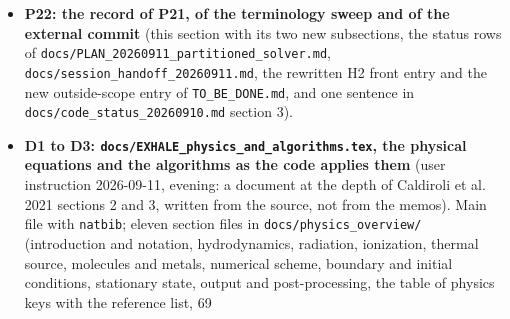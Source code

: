 \documentclass[english,a4paper]{my_memo}
\begin{document}
\begin{itemize}
  Tests: \texttt{carrier\_retry} \textbf{122/0 at entry, 124 PASS / 3 FAIL on a RED build}
  carrying the delivered module with the one
  \texttt{call\ equilibrate\_chemistry\_at\_fixed\_pressure} line removed, \textbf{127/0 after}.
  The new section (11) has five rows and states why the joint fixed point cannot
  be asserted on the synthetic 12-cell column at all: the shortest admissible
  trial still moves 6.46e-4 of the largest entry H2 mixing ratio, six decades
  above \texttt{relax\_tol\ =\ 1e-10}. What it asserts instead is the consistency the joint
  fixed point rests on: the background third-body density read from the returned
  composition (GREEN 4.7244E-07 against the entry composition\textquotesingle s 5.5008E-03; RED
  5.4938E-03 against 1.2191E-16), the background temperature (GREEN 2.5675E-07
  against 5.4837E-03; RED 5.5241E-03 against 0), and one further sweep moving the
  composition by 1.3637E-10 against hybrd1\textquotesingle s own \texttt{xtol\ =\ sqrt(eps)\ =\ 1.5E-08}
  (RED 2.0110E-04). Every other suite whose driver links
  \texttt{diffusive\_photochemistry} is unchanged before and after:
  \texttt{carrier\_returned\_state\_acceptance} 36/0, \texttt{attempted\_step} 70/0,
  \texttt{steady\_species\_rows} 195/0, \texttt{certification} 70/0,
  \texttt{carrier\_constraint\_attribution} 10/0, \texttt{carrier\_reference\_scales} 14/0,
  \texttt{element\_operator} 24/0, \texttt{species\_masses} 9/0.
\item
  \textbf{P22: the record of P21, of the terminology sweep and of the external
  commit} (this section with its two new subsections, the status rows of
  \texttt{docs/PLAN\_20260911\_partitioned\_solver.md}, \texttt{docs/session\_handoff\_20260911.md},
  the rewritten H2 front entry and the new outside-scope entry of
  \texttt{TO\_BE\_DONE.md}, and one sentence in \texttt{docs/code\_status\_20260910.md}
  section 3).
\item
  \textbf{D1 to D3: \texttt{docs/EXHALE\_physics\_and\_algorithms.tex}, the physical equations
  and the algorithms as the code applies them} (user instruction 2026-09-11,
  evening: a document at the depth of Caldiroli et al. 2021 sections 2 and 3,
  written from the source, not from the memos). Main file with \texttt{natbib}; eleven
  section files in \texttt{docs/physics\_overview/} (introduction and notation,
  hydrodynamics, radiation, ionization, thermal source, molecules and metals,
  numerical scheme, boundary and initial conditions, stationary state, output
  and post-processing, the table of physics keys with the reference list, 69

\end{itemize}
\end{document}
